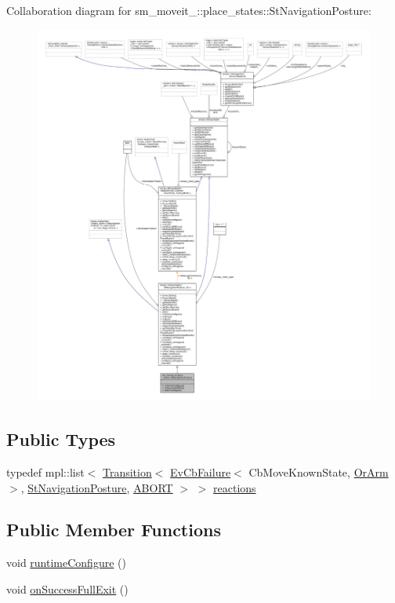 Collaboration diagram for sm\+\_\+moveit\+\_\+:\+:place\+\_\+states\+:\+:St\+Navigation\+Posture\+:
\nopagebreak
\begin{figure}[H]
\begin{center}
\leavevmode
\includegraphics[width=350pt]{structsm__moveit__4_1_1place__states_1_1StNavigationPosture__coll__graph}
\end{center}
\end{figure}
\subsection*{Public Types}
\begin{DoxyCompactItemize}
\item 
typedef mpl\+::list$<$ \hyperlink{classsmacc_1_1Transition}{Transition}$<$ \hyperlink{structsmacc_1_1EvCbFailure}{Ev\+Cb\+Failure}$<$ Cb\+Move\+Known\+State, \hyperlink{classsm__moveit__4_1_1OrArm}{Or\+Arm} $>$, \hyperlink{structsm__moveit__4_1_1place__states_1_1StNavigationPosture}{St\+Navigation\+Posture}, \hyperlink{structsmacc_1_1default__transition__tags_1_1ABORT}{A\+B\+O\+RT} $>$ $>$ \hyperlink{structsm__moveit__4_1_1place__states_1_1StNavigationPosture_aef5fd3b6c31c7e0c2dfd14753496eb7c}{reactions}
\end{DoxyCompactItemize}
\subsection*{Public Member Functions}
\begin{DoxyCompactItemize}
\item 
void \hyperlink{structsm__moveit__4_1_1place__states_1_1StNavigationPosture_aaf8ca02fa5a8185baf6bfc55731b1926}{runtime\+Configure} ()
\item 
void \hyperlink{structsm__moveit__4_1_1place__states_1_1StNavigationPosture_a95ab74dae51538aeae46f71b515bc61e}{on\+Success\+Full\+Exit} ()
\end{DoxyCompactItemize}
